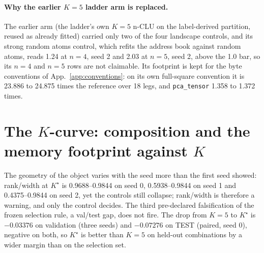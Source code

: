 \documentclass{article} %
\newcommand{\Kstar}{\ensuremath{K^{\star}}}
\begin{document}
\paragraph{Why the earlier $K=5$ ladder arm is replaced.} The earlier arm (the ladder's own
$K=5$ n-CLU on the label-derived partition, reused as already fitted) carried only two of the four
landscape controls, and its strong random atoms control, which refits the address book
against random atoms, reads 1.24 at $n=4$, seed 2 and 2.03 at $n=5$, seed 2, above the 1.0 bar, so %
its $n=4$ and $n=5$ rows are not claimable. Its footprint is kept for the byte conventions of
App.~\ref{app:conventions}: on its own full-square convention it is 23.886 to 24.875 times the %
reference over 18 legs, and \texttt{pca\_tensor} 1.358 to 1.372 times. %
\section{The $K$-curve: composition and the memory footprint against $K$}
\label{app:kcurve}

The geometry of the object varies with the seed more than the first seed showed:
rank/width at $\Kstar$ is 0.9688--0.9844 on seed 0, 0.5938--0.9844 on seed 1 and
0.4375--0.9844 on seed 2, yet the controls still collapse; rank/width is therefore a warning, and
only the control decides. %
The third pre-declared falsification of the frozen selection rule, a val/test gap, does not fire.
The drop from $K=5$ to $\Kstar$ is $-0.03376$ on validation (three seeds) and $-0.07276$ on
TEST (paired, seed 0), negative on both, so $\Kstar$ is better than $K=5$ on held-out combinations
by a wider margin than on the selection set. %
\end{document}
